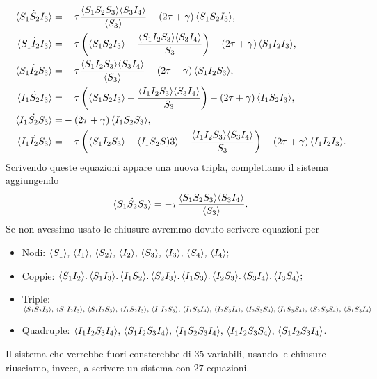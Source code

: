  \begin{equation*}
 \begin{aligned}
 		\dot{\angol{S_1S_2I_3}} =&\spa \tau \frac{\angol{S_1S_2S_3}\angol{S_3I_4}}{\angol{S_3}} -\tonde{ 2\tau + \gamma} \angol{S_1S_2I_3},\\
 		\dot{\angol{S_1I_2I_3}} =&\spa \tau \tonde{ \angol{S_1S_2I_3}+\frac{\angol{S_1I_2S_3}\angol{S_3I_4}}{S_3}} -\tonde{ 2\tau + \gamma} \angol{S_1I_2I_3},\\
 		\dot{\angol{S_1I_2S_3}} =&-\tau \frac{\angol{S_1I_2S_3}\angol{S_3I_4}}{\angol{S_3} }-\tonde{ 2\tau + \gamma} \angol{S_1I_2S_3},\\
 		\dot{\angol{I_1S_2I_3}} =&\spa \tau \tonde{ \angol{S_1S_2I_3}+\frac{\angol{I_1I_2S_3}\angol{S_3I_4}}{S_3}} -\tonde{ 2\tau + \gamma} \angol{I_1S_2I_3},\\
 		\dot{\angol{I_1S_2S_3}}=&-\tonde{ 2 \tau + \gamma} \angol{I_1S_2S_3},\\
 		\dot{\angol{I_1I_2S_3}} =&\spa\tau \tonde{ \angol{S_1I_2S_3}+ \angol{I_1S_2S)3} - \frac{\angol{I_1I_2S_3}\angol{S_3I_4}}{S_3}} -\tonde{ 2\tau + \gamma} \angol{I_1I_2I_3}.
 	\end{aligned}
 \end{equation*}
Scrivendo queste equazioni appare una nuova tripla, completiamo il sistema aggiungendo 
$$ \dot{\langle S_1S_2S_3 \rangle} =-\tau \frac{ \langle S_1S_2S_3 \rangle\langle S_3I_4 \rangle}{\langle S_3 \rangle}.$$
Se non avessimo usato le chiusure avremmo dovuto scrivere equazioni per 
\begin{itemize}
	\item Nodi: $\langle S_1 \rangle,\, \langle I_1 \rangle, \, \langle S_2 \rangle,\, \langle I_2 \rangle, \,\langle S_3 \rangle,\, \langle I_3 \rangle, \,\langle S_4 \rangle,\, \langle I_4 \rangle;$
	\item Coppie: 
$  \langle S_1I_2 \rangle. \,
	\langle S_1I_3 \rangle. \,
	\langle I_1S_2 \rangle. \,
	\langle S_2I_3 \rangle. \,
	\langle I_1S_3 \rangle. \,
	\langle I_2S_3 \rangle. \,
	\langle S_3I_4 \rangle. \,
	\langle I_3S_4 \rangle;$
	\item Triple: $ \langle S_1S_2I_3 \rangle, \,\langle  S_1I_2I_3 \rangle, \, \langle S_1I_2S_3 \rangle, \, \langle I_1S_2I_3 \rangle, \, \langle I_1I_2S_3 \rangle, \, \langle I_1S_3I_4 \rangle, \, \langle I_2S_3I_4 \rangle, \, \langle I_2S_3S_4 \rangle,\\
	 \langle I_1S_3S_4 \rangle, \, \langle S_2S_3S_4 \rangle, \, \langle S_1S_3I_4 \rangle$
	 \item Quadruple: $\langle I_1I_2S_3I_4 \rangle,\,
\langle S_1I_2S_3I_4 \rangle,\,
\langle I_1S_2S_3I_4 \rangle,\,
\langle I_1I_2S_3S_4 \rangle,\,
\langle S_1I_2S_3I_4 \rangle$.
\end{itemize}
Il sistema che verrebbe fuori consterebbe di $35$ variabili, usando le chiusure riusciamo, invece, a scrivere un sistema con $27$ equazioni.



 